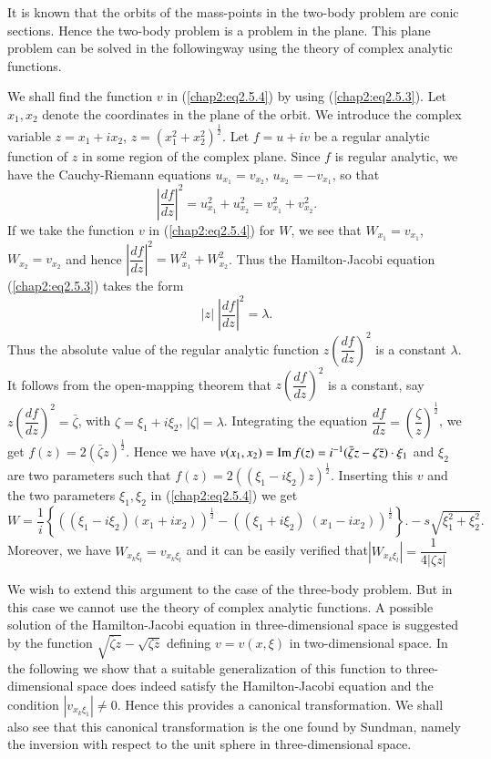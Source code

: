 It is known that the orbits of the mass-points in the two-body problem are conic sections. Hence the two-body problem is a problem in the plane. This plane problem can be solved in the following\pageoriginale way using the theory of complex analytic functions.

We shall find the function $v$ in (\ref{chap2:eq2.5.4}) by using (\ref{chap2:eq2.5.3}). Let $x_1, x_2$ denote the coordinates in the plane of the orbit. We introduce the complex variable $z = x_1 + ix_2$, $z = (x^2_1 + x^2_2)^{\frac{1}{2}}$. Let $f = u + iv$ be a regular analytic function of $z$ in some region of the complex plane. Since $f$ is regular analytic, we have the Cauchy-Riemann equations $u_{x_1} = v_{x_2}$, $u_{x_2} = -v_{x_1}$, so that 
$$
\left| \frac{df}{dz}\right|^2 = u^2_{x_1} + u^2_{x_2} = v^2_{x_1} + v^2_{x_2}. 
$$
If we take the function $v$ in (\ref{chap2:eq2.5.4}) for $W$, we see that $W_{x_1} = v_{x_1}$, $W_{x_2} = v_{x_2}$ and hence $\left|\dfrac{df}{dz} \right|^2 = W^2_{x_1} + W^2_{x_2}$. Thus the Hamilton-Jacobi equation (\ref{chap2:eq2.5.3}) takes the form 
$$
|z| \; \left|\frac{df}{dz} \right|^2 = \lambda.
$$
Thus the absolute value of the regular analytic function $z\left(\dfrac{df}{dz} \right)^2$ is a constant $\lambda$. It follows from the open-mapping theorem that $z\left(\dfrac{df}{dz} \right)^2$ is a constant, say $z \left(\dfrac{df}{dz} \right)^2 = \bar{\zeta}$, with $\zeta = \xi_1 + i \xi_2$, $|\zeta| = \lambda$. Integrating the equation $\dfrac{df}{dz} = \left(\dfrac{\zeta}{z} \right)^{\frac{1}{2}}$, we get $f(z) = 2(\bar{\zeta}z)^{\frac{1}{2}}$. Hence we have $v(x_1, x_2) = \operatorname{Im} f(z) = i^{-1} (\bar{\zeta} z - \zeta \bar{z}) \cdot \xi_1$ and $\xi_2$ are two parameters such that $f(z) = 2 ((\xi_1 - i \xi_2)z)^{\frac{1}{2}}$. Inserting this $v$ and the two parameters $\xi_1, \xi_2$ in (\ref{chap2:eq2.5.4}) we get
{\fontsize{10}{12}\selectfont
$$
W = \frac{1}{i} \left\{((\xi_1 - i \xi_2) (x_1 + ix_2))^{\frac{1}{2}} - ((\xi_1 + i \xi_2) \; (x_1 - ix_2))^{\frac{1}{2}} \right\}.  - s\sqrt{\xi^2_1 + \xi^2_2}. 
$$}
Moreover, we have $W_{x_k\xi_l} = v_{x_k\xi_l}$ and it can be easily verified that\pageoriginale $|W_{x_k \xi_l}| = \dfrac{1}{4 |\zeta z|}$

We wish to extend this argument to the case of the three-body problem. But in this case we cannot use the theory of complex analytic functions. A possible solution of the Hamilton-Jacobi equation in three-dimensional space is suggested by the function $\sqrt{\overline{\zeta}z} - \sqrt{\zeta \overline{z}}$ defining $v = v(x, \xi)$ in two-dimensional space. In the following we show that a suitable generalization of this function to three-dimensional space does indeed satisfy the Hamilton-Jacobi equation and the condition $|v_{x_k \xi_1}| \neq 0$. Hence this provides a canonical transformation. We shall also see that this canonical transformation is the one found by Sundman, namely the inversion with respect to the  unit sphere in three-dimensional space.


